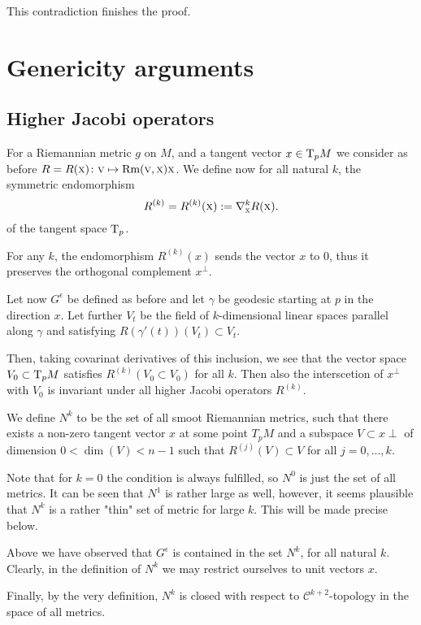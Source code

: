 \documentclass[a4paper,10pt]{article}
\begin{document}
 
 This contradiction finishes the proof.
 \qeds
 
 
 
 \section{Genericity arguments}
 \subsection{Higher Jacobi operators}
 For a Riemannian metric $g$ on $M$, and a tangent vector $x\in \mathrm{T}_p M$ we 
 consider as before $R=R(\text{\sc{x}})\colon\text{\sc{v}}\mapsto \operatorname{Rm}(\text{\sc{v}},\text{\sc{x}})\text{\sc{x}}$.
 We define now for all natural $k$, the symmetric endomorphism
 \[R^{(k)}=R^{(k)}(\text{\sc{x}})\mathrel{{:}{=}}\nabla^k_{\text{\sc{x}}}R(\text{\sc{x}}).\]
 of the tangent space $\mathrm{T} _p $.
 

For any $k$, the endomorphism $R^{(k)} (x)$ sends the vector $x$ to $0$, thus it preserves the 
 orthogonal complement $x^{\perp}$.
 
 
 
 Let now $G^{\epsilon}$ be defined as before and let $\gamma$ be  geodesic starting at $p$ in the direction $x$. Let further $V_t$ be the field of $k$-dimensional linear spaces parallel along $\gamma$ and satisfying $R(\gamma'(t)) (V_t)\subset V_t$.
 
 Then, taking covarinat derivatives of this inclusion, we see that the vector space $V_0\subset \mathrm{T}_p M$ satisfies $R^{(k)} (V_0 \subset V_0)$ for all $k$.   Then also the interscetion of $x^{\perp}$  with $V_0$ is invariant under all higher Jacobi operators $R^{(k)}$.
 
 
 We define $N^{k}$ to be the set of all smoot Riemannian metrics, such that there exists a non-zero tangent vector $x$ at some point $T_p M$ and a subspace $V\subset x{\perp}$ of dimension $0<\dim (V)<n-1$ such that $R^{(j)} (V) \subset V$ for all $j=0,...,k$.
 
 Note that for $k=0$ the condition is always fulfilled, so $N^0$ is just the set of all metrics.
 It can be seen that $N^1$ is rather large as well, however, it seems plausible that $N^k$ is a rather "thin" set of metric for large $k$. This will be made precise below.
 
 
 Above we have observed that $G^{\epsilon}$ is contained in the set $N^{k}$, for all natural $k$.
 Clearly, in the definition of $N^{k}$ we may restrict ourselves to unit vectors $x$.
 
 Finally, by the very definition, $N^k$ is closed with respect to $\mathcal C^{k+2}$-topology in the space of all metrics.
  
\end{document}
